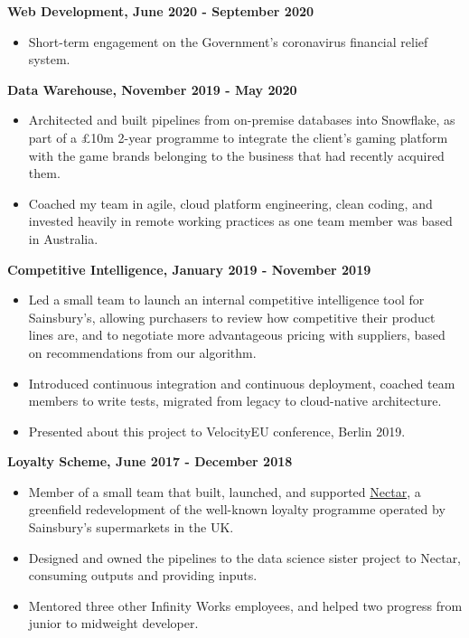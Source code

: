 \documentclass[a4paper,10pt]{article}
\begin{document}
\textbf{Web Development, June 2020 - September 2020}
\begin{itemize}
    \item Short-term engagement on the Government's coronavirus financial
          relief system.
\end{itemize}

\textbf{Data Warehouse, November 2019 - May 2020}
\begin{itemize}
    \item Architected and built pipelines from on-premise databases into
          Snowflake, as part of a £10m 2-year programme to integrate the client's gaming
          platform with the game brands belonging to the business that had recently
          acquired them.
    \item Coached my team in agile, cloud platform engineering, clean coding,
          and invested heavily in remote working practices as one team member was based
          in Australia.
\end{itemize}

\textbf{Competitive Intelligence, January 2019 - November 2019}
\begin{itemize}
    \item Led a small team to launch an internal competitive intelligence tool
          for Sainsbury's, allowing purchasers to review how competitive their product
          lines are, and to negotiate more advantageous pricing with suppliers, based on
          recommendations from our algorithm.
    \item Introduced continuous integration and continuous deployment, coached
          team members to write tests, migrated from legacy to cloud-native architecture.
    \item Presented about this project to VelocityEU conference, Berlin 2019.
\end{itemize}

\textbf{Loyalty Scheme, June 2017 - December 2018}
\begin{itemize}
    \item Member of a small team that built, launched, and supported
          \href{https://nectar.sainsburys.co.uk}{Nectar}, a greenfield redevelopment of
          the well-known loyalty programme operated by Sainsbury's supermarkets in the
          UK.
    \item Designed and owned the pipelines to the data science sister project
          to Nectar, consuming outputs and providing inputs.
    \item Mentored three other Infinity Works employees, and helped two
          progress from junior to midweight developer.
\end{itemize}
\end{document}

